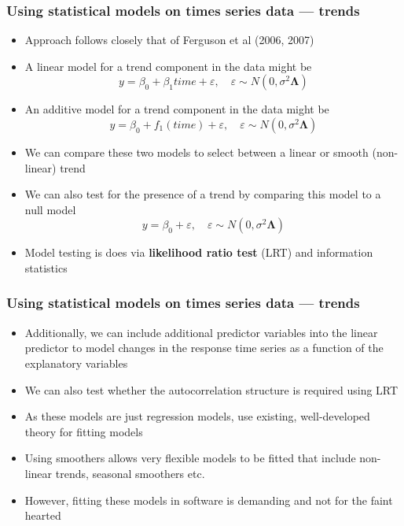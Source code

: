 \documentclass{beamer}
\begin{document}
\begin{frame}
   \frametitle{Using statistical models on times series data --- trends}
   \begin{itemize}
      \item Approach follows closely that of Ferguson et al (2006, 2007)
      \item A linear model for a trend component in the data might be
      $$y = \beta_0 + \beta_1time + \varepsilon, \quad \varepsilon \sim N(0, \sigma^2\mathbf{\Lambda})$$
      \item An additive model for a trend component in the data might be
      $$y = \beta_0 + f_1(time) + \varepsilon, \quad \varepsilon \sim N(0, \sigma^2\mathbf{\Lambda})$$
      \item We can compare these two models to select between a linear or smooth (non-linear) trend
      \item We can also test for the presence of a trend by comparing this model to a null model
      $$y = \beta_0 + \varepsilon, \quad \varepsilon \sim N(0, \sigma^2\mathbf{\Lambda})$$
      \item Model testing is does via \textbf{likelihood ratio test} (LRT) and information statistics
   \end{itemize}
\end{frame}

\begin{frame}
   \frametitle{Using statistical models on times series data --- trends}
   \begin{itemize}
      \item Additionally, we can include additional predictor variables into the linear predictor to model changes in the response time series as a function of the explanatory variables
      \item We can also test whether the autocorrelation structure is required using LRT
      \item As these models are just regression models, use existing, well-developed theory for fitting models
      \item Using smoothers allows very flexible models to be fitted that include non-linear trends, seasonal smoothers etc.
      \item However, fitting these models in software is demanding and not for the faint hearted
   \end{itemize}
\end{frame}
\end{document}
